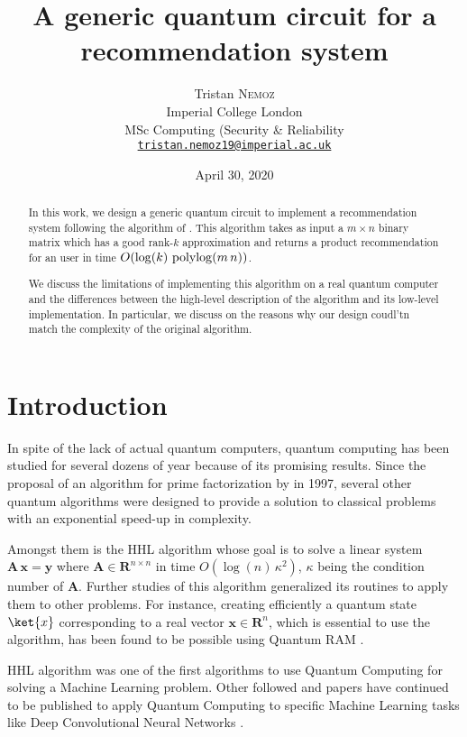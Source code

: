 \documentclass[11pt, a4paper]{article}
\date{April 30, 2020}
\author{Tristan \textsc{Nemoz}\\Imperial College London\\MSc Computing (Security \& Reliability\\\href{mailto:tristan.nemoz19@imperial.ac.uk}{\texttt{tristan.nemoz19@imperial.ac.uk}}}
\title{A generic quantum circuit for a recommendation system}
\begin{document}
	
	\maketitle
    \begin{abstract}
        In this work, we design a generic quantum circuit to implement a recommendation system following the algorithm of \citeauthor{QRS}. This algorithm takes as input a \(m\times n\) binary matrix which has a good rank-\(k\) approximation and returns a product recommendation for an user in time \(O(\log(k)\,\operatorname{polylog}(m\,n))\).
        
        We discuss the limitations of implementing this algorithm on a real quantum computer and the differences between the high-level description of the algorithm and its low-level implementation. In particular, we discuss on the reasons why our design coudl'tn match the complexity of the original algorithm.
    \end{abstract}
    
    \section{Introduction}
        In spite of the lack of actual quantum computers, quantum computing has been studied for several dozens of year because of its promising results. Since the proposal of an algorithm for prime factorization \cite{Shor} by \citeauthor{Shor} in 1997, several other quantum algorithms were designed to provide a solution to classical problems with an exponential speed-up in complexity.
        
        Amongst them is the HHL algorithm \cite{HHL} whose goal is to solve a linear system \(\mathbf{A}\,\mathbf{x}=\mathbf{y}\) where \(\mathbf{A}\in\mathbf{R}^{n\times n}\) in time \(O\left(\log(n)\,\kappa^2\right)\), \(\kappa\) being the condition number of \(\mathbf{A}\). Further studies of this algorithm generalized its routines to apply them to other problems. For instance, creating efficiently a quantum state \(\ket{x}\) corresponding to a real vector \(\mathbf{x}\in\mathbf{R}^n\), which is essential to use the algorithm, has been found to be possible using Quantum RAM \cite{Prakash, QRAM, QRAMCircuit}.
        
        HHL algorithm was one of the first algorithms to use Quantum Computing for solving a Machine Learning problem. Other followed and papers have continued to be published to apply Quantum Computing to specific Machine Learning tasks like Deep Convolutional Neural Networks \cite{QCNN}.
        
\end{document}
